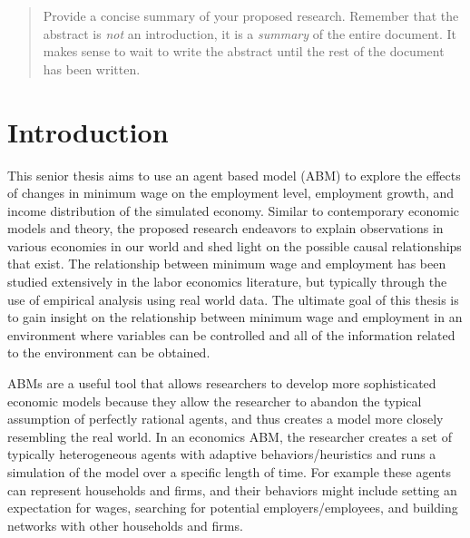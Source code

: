 \documentclass[11pt]{article}
\begin{document}

\begin{quote}

  Provide a concise summary of your proposed research. Remember that the abstract
  is {\it not\/} an introduction, it is a {\it summary\/} of the entire document.
  It makes sense to wait to write the abstract until the rest of the document has
  been written.

\end{quote}

\section{Introduction}
\label{sec:introduction}


This senior thesis aims to use an agent based model (ABM) to explore the effects
of changes in minimum wage on the employment level, employment growth, and income
distribution of the simulated economy.  Similar to contemporary economic models
and theory, the proposed research endeavors to explain observations in various
economies in our world and shed light on the possible causal relationships that
exist. The relationship between minimum wage and employment has been studied
extensively in the labor economics literature, but typically through the use
of empirical analysis using real world data. The ultimate goal of this thesis
is to gain insight on the relationship between minimum wage and employment in
an environment where variables can be controlled and all of the information
related to the environment can be obtained.

ABMs are a useful tool that allows researchers to develop more sophisticated
economic models because they allow the researcher to abandon the typical assumption
of perfectly rational agents, and thus creates a model more closely resembling
the real world. In an economics ABM,  the researcher creates a set of typically
 heterogeneous agents with adaptive behaviors/heuristics and runs a simulation
 of the model over a specific length of time. For example these agents can
 represent households and firms, and their behaviors might include setting an
 expectation for wages, searching for potential employers/employees, and building
 networks with other households and firms.
\end{document}
